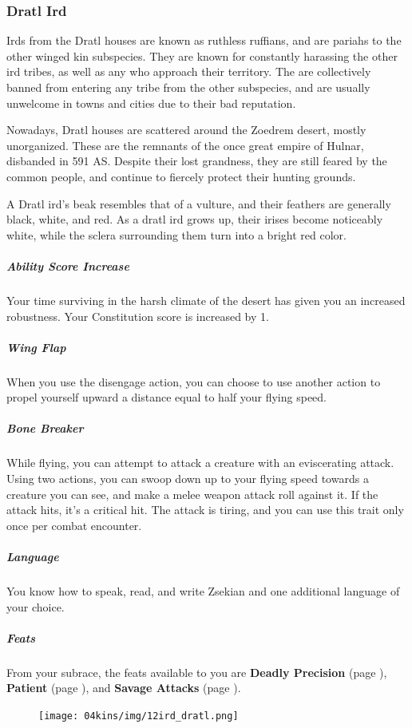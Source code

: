 \subsubsection{Dratl Ird}
    Irds from the Dratl houses are known as ruthless ruffians, and are pariahs to the other winged kin subspecies.
    They are known for constantly harassing the other ird tribes, as well as any who approach their territory.
    The are collectively banned from entering any tribe from the other subspecies, and are usually unwelcome in towns and cities due to their bad reputation.

    Nowadays, Dratl houses are scattered around the Zoedrem desert, mostly unorganized.
    These are the remnants of the once great empire of Hulnar, disbanded in 591 AS.
    Despite their lost grandness, they are still feared by the common people, and continue to fiercely protect their hunting grounds.

    A Dratl ird's beak resembles that of a vulture, and their feathers are generally black, white, and red.
    As a dratl ird grows up, their irises become noticeably white, while the sclera surrounding them turn into a bright red color.

    \subparagraph{Ability Score Increase} Your time surviving in the harsh climate of the desert has given you an increased robustness.
    Your Constitution score is increased by 1.

    \subparagraph{Wing Flap} When you use the disengage action, you can choose to use another action to propel yourself upward a distance equal to half your flying speed.

    \subparagraph{Bone Breaker} While flying, you can attempt to attack a creature with an eviscerating attack.
    Using two actions, you can swoop down up to your flying speed towards a creature you can see, and make a melee weapon attack roll against it.
    If the attack hits, it's a critical hit.
    The attack is tiring, and you can use this trait only once per combat encounter.

    \subparagraph{Language} You know how to speak, read, and write Zsekian and one additional language of your choice.

    \subparagraph{Feats} From your subrace, the feats available to you are
    \textbf{Deadly Precision} (page \pageref{feat::deadlyprecision}),
    \textbf{Patient} (page \pageref{feat::patient}), and
    \textbf{Savage Attacks} (page \pageref{feat::savageattacks}).

\begin{figure}[!b]
    \centering
    \texttt{[image: 04kins/img/12ird\_dratl.png]}
\end{figure}


\newpage
